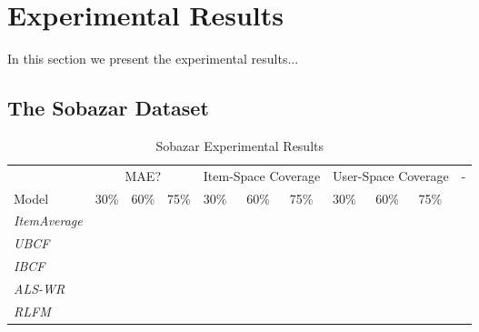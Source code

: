 \section{Experimental Results}

In this section we present the experimental results...


\subsection{The Sobazar Dataset}

\begin{table}
\centering
\begin{tabular}{|l|l|l|l|l|l|l|l|l|l|l|}
\hline
								 					&			\multicolumn{3}{c|}{MAE?} 		&			\multicolumn{3}{c|}{Item-Space Coverage}		&		\multicolumn{3}{c|}{User-Space Coverage}		& 		-		\\ 
							Model 			& 	30\%		& 	60\%	 	& 		75\%				& 	30\%			& 				60\%	 				& 			75\%	 			& 	30\%				& 			60\%	 			& 	75\%						&					\\ \hline	
\emph{ItemAverage}		&						&						&									&							&												&										& 							& 				 					& 									&					\\ \hline	
\emph{UBCF}						&						&			 			&									&							&			 									&										& 							& 			 						& 									&					\\ \hline	
\emph{IBCF}						&						&			 			&									&							&												&										& 							& 			 						& 									&					\\ \hline	
\emph{ALS-WR}				&						&			 			&									&							&												&										& 							& 				 					& 									&					\\ \hline	
\emph{RLFM}						&						&			 			&									&							&												&										& 							& 				 					& 									&					\\ \hline	
\end{tabular}
\caption{Sobazar Experimental Results}
\end{table}









